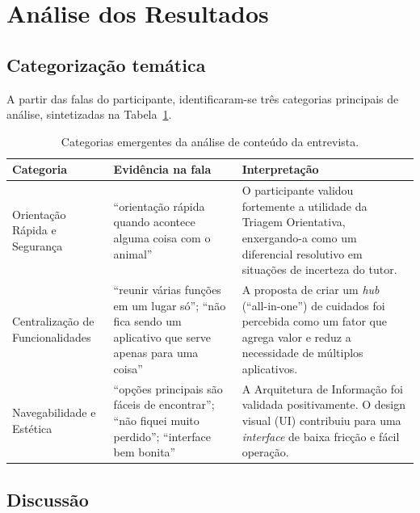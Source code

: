 \documentclass[12pt,a4paper]{article}
\begin{document}
\section{Análise dos Resultados}

\subsection{Categorização temática}

A partir das falas do participante, identificaram-se três categorias principais de análise, sintetizadas na Tabela~\ref{tab:categorias}.

\begin{table}[h!]
\centering
\small
\begin{tabular}{@{}>{\raggedright\arraybackslash}p{3.2cm}>{\raggedright\arraybackslash}p{4.8cm}>{\raggedright\arraybackslash}p{5.5cm}@{}}
\toprule
\textbf{Categoria} & \textbf{Evidência na fala} & \textbf{Interpretação} \\
\midrule
Orientação Rápida e Segurança &
\enquote{orientação rápida quando acontece alguma coisa com o animal} &
O participante validou fortemente a utilidade da Triagem Orientativa, enxergando-a como um diferencial resolutivo em situações de incerteza do tutor. \\
\addlinespace
Centralização de Funcionalidades &
\enquote{reunir várias funções em um lugar só}; \enquote{não fica sendo um aplicativo que serve apenas para uma coisa} &
A proposta de criar um \textit{hub} (\enquote{all-in-one}) de cuidados foi percebida como um fator que agrega valor e reduz a necessidade de múltiplos aplicativos. \\
\addlinespace
Navegabilidade e Estética &
\enquote{opções principais são fáceis de encontrar}; \enquote{não fiquei muito perdido}; \enquote{interface bem bonita} &
A Arquitetura de Informação foi validada positivamente. O design visual (UI) contribuiu para uma \textit{interface} de baixa fricção e fácil operação. \\
\bottomrule
\end{tabular}
\caption{Categorias emergentes da análise de conteúdo da entrevista.}
\label{tab:categorias}
\end{table}

\subsection{Discussão}
\end{document}
